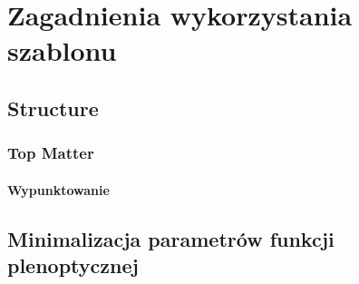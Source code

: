 \chapter{Zagadnienia wykorzystania szablonu}
\label{ch:funplenop}


\section{Structure}
\label{sec:ex1}


\subsection{Top Matter}
\label{subsec:ex1}

\subsubsection{Wypunktowanie}
\label{ssubssec:ex1}

\section{Minimalizacja parametrów funkcji plenoptycznej}
\label{sec:mpfp}